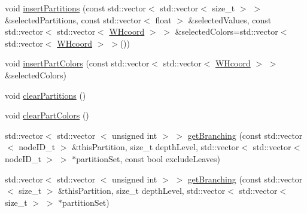 \begin{DoxyCompactItemize}
\item 
void \hyperlink{classWHtree_a5768ec8e7fc61966ab65fc3c0ed38bda}{insert\-Partitions} (const std\-::vector$<$ std\-::vector$<$ size\-\_\-t $>$ $>$ \&selected\-Partitions, const std\-::vector$<$ float $>$ \&selected\-Values, const std\-::vector$<$ std\-::vector$<$ \hyperlink{classWHcoord}{\-W\-Hcoord} $>$ $>$ \&selected\-Colors=std\-::vector$<$ std\-::vector$<$ \hyperlink{classWHcoord}{\-W\-Hcoord} $>$ $>$())
\item 
void \hyperlink{classWHtree_aae629a3810d9c9dad305fc3024a32d39}{insert\-Part\-Colors} (const std\-::vector$<$ std\-::vector$<$ \hyperlink{classWHcoord}{\-W\-Hcoord} $>$ $>$ \&selected\-Colors)
\item 
void \hyperlink{classWHtree_a764ababf846cb18b5039d35b3dd02051}{clear\-Partitions} ()
\item 
void \hyperlink{classWHtree_a788d7d3be48109af762b2fba429a171b}{clear\-Part\-Colors} ()
\item 
std\-::vector$<$ std\-::vector\*
$<$ unsigned int $>$ $>$ \hyperlink{classWHtree_afeb2829af19346f661662004c3888b2d}{get\-Branching} (const std\-::vector$<$ node\-I\-D\-\_\-t $>$ \&this\-Partition, size\-\_\-t depth\-Level, std\-::vector$<$ std\-::vector$<$ node\-I\-D\-\_\-t $>$ $>$ $\ast$partition\-Set, const bool exclude\-Leaves)
\item 
std\-::vector$<$ std\-::vector\*
$<$ unsigned int $>$ $>$ \hyperlink{classWHtree_a0128fc5f21ebf318ef83c8c113e0e7f1}{get\-Branching} (const std\-::vector$<$ size\-\_\-t $>$ \&this\-Partition, size\-\_\-t depth\-Level, std\-::vector$<$ std\-::vector$<$ size\-\_\-t $>$ $>$ $\ast$partition\-Set)
\end{DoxyCompactItemize}
